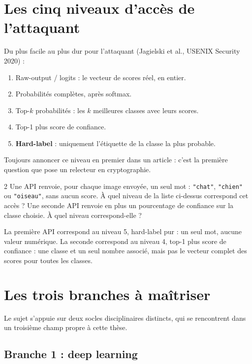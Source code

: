 \documentclass[11pt]{article}
\begin{document}
\section{Les cinq niveaux d'accès de l'attaquant}

Du plus facile au plus dur pour l'attaquant (Jagielski et al., USENIX Security 2020) :

\begin{enumerate}
  \item Raw-output / logits : le vecteur de scores réel, en entier.
  \item Probabilités complètes, après softmax.
  \item Top-$k$ probabilités : les $k$ meilleures classes avec leurs scores.
  \item Top-1 plus score de confiance.
  \item \textbf{Hard-label} : uniquement l'étiquette de la classe la plus probable.
\end{enumerate}

Toujours annoncer ce niveau en premier dans un article : c'est la première question que pose un relecteur en cryptographie.

\begin{exo}{2}
Une API renvoie, pour chaque image envoyée, un seul mot : \texttt{"chat"}, \texttt{"chien"} ou \texttt{"oiseau"}, sans aucun score. À quel niveau de la liste ci-dessus correspond cet accès ? Une seconde API renvoie en plus un pourcentage de confiance sur la classe choisie. À quel niveau correspond-elle ?
\end{exo}
\begin{sol}
La première API correspond au niveau 5, hard-label pur : un seul mot, aucune valeur numérique. La seconde correspond au niveau 4, top-1 plus score de confiance : une classe et un seul nombre associé, mais pas le vecteur complet des scores pour toutes les classes.
\end{sol}

\section{Les trois branches à maîtriser}

Le sujet s'appuie sur deux socles disciplinaires distincts, qui se rencontrent dans un troisième champ propre à cette thèse.

\subsection{Branche 1 : deep learning}
\end{document}
